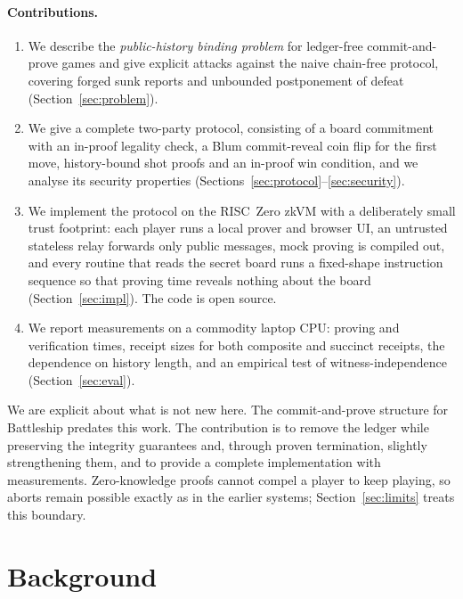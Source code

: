 \documentclass[11pt,a4paper]{article}
\begin{document}
\paragraph{Contributions.}
\begin{enumerate}[noitemsep,topsep=2pt]
  \item We describe the \emph{public-history binding problem} for ledger-free
        commit-and-prove games and give explicit attacks against the naive
        chain-free protocol, covering forged sunk reports and unbounded
        postponement of defeat (Section~\ref{sec:problem}).
  \item We give a complete two-party protocol, consisting of a board commitment
        with an in-proof legality check, a Blum commit-reveal coin flip
        \cite{blum} for the first move, history-bound shot proofs and an
        in-proof win condition, and we analyse its security properties
        (Sections~\ref{sec:protocol}--\ref{sec:security}).
  \item We implement the protocol on the RISC~Zero zkVM \cite{risc0} with a
        deliberately small trust footprint: each player runs a local prover and
        browser UI, an untrusted stateless relay forwards only public messages,
        mock proving is compiled out, and every routine that reads the secret
        board runs a fixed-shape instruction sequence so that proving time
        reveals nothing about the board (Section~\ref{sec:impl}). The code is
        open source.
  \item We report measurements on a commodity laptop CPU: proving and
        verification times, receipt sizes for both composite and succinct
        receipts, the dependence on history length, and an empirical test of
        witness-independence (Section~\ref{sec:eval}).
\end{enumerate}

We are explicit about what is not new here. The commit-and-prove structure for
Battleship predates this work. The contribution is to remove the ledger while
preserving the integrity guarantees and, through proven termination, slightly
strengthening them, and to provide a complete implementation with measurements.
Zero-knowledge proofs cannot compel a player to keep playing, so aborts remain
possible exactly as in the earlier systems; Section~\ref{sec:limits} treats
this boundary.

\section{Background}
\label{sec:background}
\end{document}
